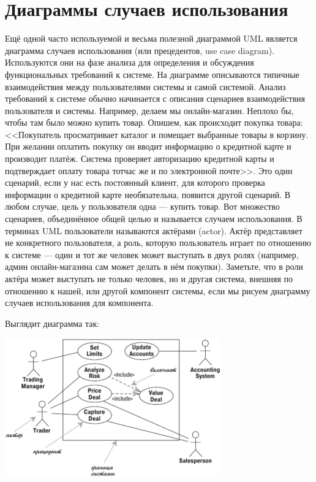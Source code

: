 \documentclass[a5paper]{article}
\begin{document}
\section{Диаграммы случаев использования}

Ещё одной часто используемой и весьма полезной диаграммой UML является диаграмма случаев использования (или прецедентов, use case diagram). Используются они на фазе анализа для определения и обсуждения функциональных требований к системе. На диаграмме описываются типичные взаимодействия между пользователями системы и самой системой. Анализ требований к системе обычно начинается с описания сценариев взаимодействия пользователя и системы. Например, делаем мы онлайн-магазин. Неплохо бы, чтобы там было можно купить товар. Опишем, как происходит покупка товара: <<Покупатель просматривает каталог и помещает выбранные товары в корзину. При желании оплатить покупку он вводит информацию о кредитной карте и производит платёж. Система проверяет авторизацию кредитной карты и подтверждает оплату товара тотчас же и по электронной почте>>. Это один сценарий, если у нас есть постоянный клиент, для которого проверка информации о кредитной карте необязательна, появится другой сценарий. В любом случае, цель у пользователя одна --- купить товар. Вот множество сценариев, объединённое общей целью и называется случаем использования. В терминах UML пользователи называются актёрами (actor). Актёр представляет не конкретного пользователя, а роль, которую пользователь играет по отношению к системе --- один и тот же человек может выступать в двух ролях (например, админ онлайн-магазина сам может делать в нём покупки). Заметьте, что в роли актёра может выступать не только человек, но и другая система, внешняя по отношению к нашей, или другой компонент системы, если мы рисуем диаграмму случаев использования для компонента. 

Выглядит диаграмма так:

\begin{center}
    \includegraphics[width=0.7\textwidth]{useCaseDiagram.png}
\end{center}
\end{document}
